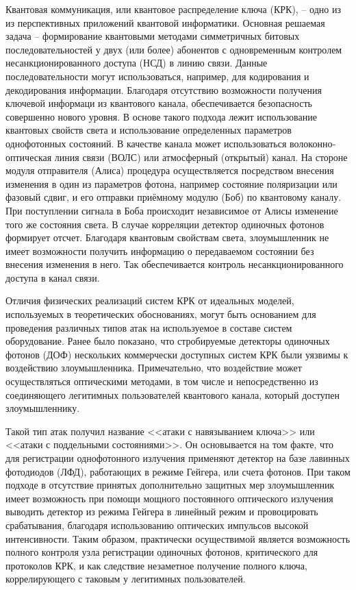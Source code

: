 
{\actuality} 

	Квантовая коммуникация, или квантовое распределение ключа (КРК), -- одно из из перспективных приложений квантовой информатики. Основная решаемая задача -- формирование квантовыми методами симметричных битовых последовательностей у двух (или более) абонентов с одновременным контролем несанкционированного доступа (НСД) в линию связи. Данные последовательности могут использоваться, например, для кодирования и декодирования информации. Благодаря отсутствию возможности получения ключевой информаци из квантового канала, обеспечивается безопасность совершенно нового уровня. В основе такого подхода лежит использование квантовых свойств света и использование определенных параметров однофотонных состояний.  В качестве канала может использоваться волоконно-оптическая линия связи (ВОЛС) или атмосферный (открытый) канал. На стороне модуля отправителя (Алиса) процедура осуществляется посредством внесения изменения в один из параметров фотона, например состояние поляризации или фазовый сдвиг, и его отправки приёмному модулю (Боб) по квантовому каналу. При поступлении сигнала в Боба происходит независимое от Алисы изменение того же состояния света. В случае корреляции детектор одиночных фотонов формирует отсчет. Благодаря квантовым свойствам света, злоумышленник не имеет возможности получить информацию о передаваемом состоянии без внесения изменения в него. Так обеспечивается контроль несанкционированного доступа в канал связи.
	
	Отличия физических реализаций систем КРК от идеальных моделей, используемых в теоретических обоснованиях, могут быть основанием для проведения различных типов атак на используемое в составе систем оборудование. Ранее было показано, что стробируемые детекторы одиночных фотонов (ДОФ) нескольких коммерчески доступных систем КРК были уязвимы к воздействию злоумышленника. Примечательно, что воздействие может осуществляться оптическими методами, в том числе и  непосредственно из соединяющего легитимных пользователей квантового канала, который доступен злоумышленнику. 
	
	Такой тип атак получил название <<атаки с навязыванием ключа>> или <<атаки с поддельными состояниями>>. Он основывается на том факте, что для регистрации однофотонного излучения применяют детектор на базе лавинных фотодиодов (ЛФД), работающих в режиме Гейгера, или счета фотонов. При таком подходе в отсутствие принятых дополнительно защитных мер злоумышленник имеет возможность при помощи мощного постоянного оптического излучения выводить детектор из режима Гейгера в линейный режим и провоцировать срабатывания, благодаря использованию оптических импульсов высокой интенсивности. Таким образом, практически осуществимой является возможность полного контроля узла регистрации одиночных фотонов, критического для протоколов КРК, и как следствие незаметное получение полного ключа, коррелирующего с таковым у легитимных пользователей. 
	
